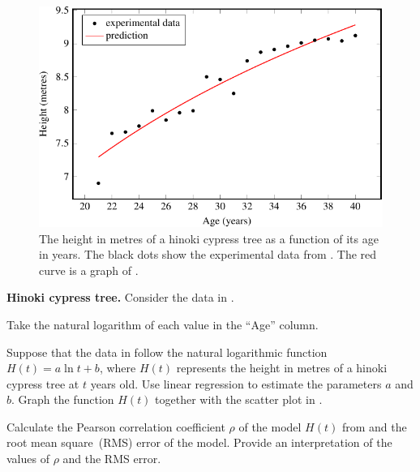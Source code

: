 \documentclass[a4paper,oneside,12pt]{article}
\begin{document}
\begin{figure}[!htbp]
\centering
\includegraphics[scale=1.1]{image/12/hinoki-cypress.pdf}
\caption{%
  The height in metres of a hinoki cypress tree as a function of its
  age in years.  The black dots show the experimental data from
  .  The red curve is a graph of
  .
}
\label{fig:logarithm:hinoki_cypress_prediction}
\end{figure}

\begin{example}
\label{eg:logarithm:hinoki_cypress_tree}
\textbf{Hinoki cypress tree.}
Consider the data in .
\begin{packedenum}
\item\label{subex:logarithm:hinoki_cypress_log_transformation}
  Take the natural logarithm of each value in the ``Age'' column.

\item\label{subex:logarithm:hinoki_cypress_log_regression}
  Suppose that the data in  follow
  the natural logarithmic function $H(t) = a \ln t + b$, where $H(t)$
  represents the height in metres of a hinoki cypress tree at $t$
  years old.  Use linear regression to estimate the parameters $a$ and
  $b$.  Graph the function $H(t)$ together with the scatter plot in
  .

\item\label{subex:logarithm:hinoki_cypress_correlation_r_RMS_error}
  Calculate the Pearson correlation coefficient $\rho$ of the model
  $H(t)$ from  and
  the root mean square~(RMS) error of the model.  Provide an
  interpretation of the values of $\rho$ and the RMS error.
\end{packedenum}
\end{example}
\end{document}
